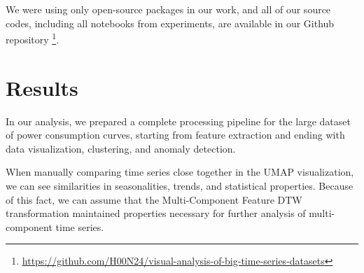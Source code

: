 We were using only open-source packages in our work, and all of our source codes, including all notebooks from experiments, are available in our Github repository \footnote{\url{https://github.com/H00N24/visual-analysis-of-big-time-series-datasets}}.

\section{Results}
In our analysis, we prepared a complete processing pipeline for the large dataset of power consumption curves, starting from feature extraction and ending with data visualization, clustering, and anomaly detection.

When manually comparing time series close together in the UMAP visualization, we can see similarities in seasonalities, trends, and statistical properties. Because of this fact, we can assume that the Multi-Component Feature DTW transformation maintained properties necessary for further analysis of multi-component time series.

